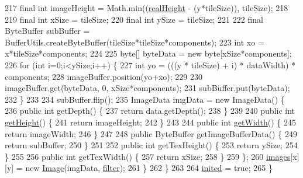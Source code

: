 \begin{DoxyCode}
217                 \textcolor{keyword}{final} \textcolor{keywordtype}{int} imageHeight = Math.min((\mbox{\hyperlink{classorg_1_1newdawn_1_1slick_1_1_big_image_a4a9f1e4248d72ff16ea9e0abe7902685}{realHeight}} - (y*tileSize)), tileSize);
218                 
219                 \textcolor{keyword}{final} \textcolor{keywordtype}{int} xSize = tileSize;
220                 \textcolor{keyword}{final} \textcolor{keywordtype}{int} ySize = tileSize;
221                 
222                 \textcolor{keyword}{final} ByteBuffer subBuffer = BufferUtils.createByteBuffer(tileSize*tileSize*components);
223                 \textcolor{keywordtype}{int} xo = x*tileSize*components;
224 
225                 byte[] byteData = \textcolor{keyword}{new} byte[xSize*components];
226                 \textcolor{keywordflow}{for} (\textcolor{keywordtype}{int} i=0;i<ySize;i++) \{
227                     \textcolor{keywordtype}{int} yo = (((y * tileSize) + i) * dataWidth) * components;
228                     imageBuffer.position(yo+xo);
229                     
230                     imageBuffer.get(byteData, 0, xSize*components);
231                     subBuffer.put(byteData);
232                 \}
233                 
234                 subBuffer.flip();
235                 ImageData imgData = \textcolor{keyword}{new} ImageData() \{
236                     \textcolor{keyword}{public} \textcolor{keywordtype}{int} getDepth() \{
237                         \textcolor{keywordflow}{return} data.getDepth();
238                     \}
239 
240                     \textcolor{keyword}{public} \textcolor{keywordtype}{int} \mbox{\hyperlink{classorg_1_1newdawn_1_1slick_1_1_image_aa2594a93f5126f60ad8a72444fceee98}{getHeight}}() \{
241                         \textcolor{keywordflow}{return} imageHeight;
242                     \}
243 
244                     \textcolor{keyword}{public} \textcolor{keywordtype}{int} \mbox{\hyperlink{classorg_1_1newdawn_1_1slick_1_1_image_a94a5d32276e8a27930480223c5d69e11}{getWidth}}() \{
245                         \textcolor{keywordflow}{return} imageWidth;
246                     \}
247                     
248                     \textcolor{keyword}{public} ByteBuffer getImageBufferData() \{
249                         \textcolor{keywordflow}{return} subBuffer;
250                     \}
251 
252                     \textcolor{keyword}{public} \textcolor{keywordtype}{int} getTexHeight() \{
253                         \textcolor{keywordflow}{return} ySize;
254                     \}
255 
256                     \textcolor{keyword}{public} \textcolor{keywordtype}{int} getTexWidth() \{
257                         \textcolor{keywordflow}{return} xSize;
258                     \}
259                 \};
260                 \mbox{\hyperlink{classorg_1_1newdawn_1_1slick_1_1_big_image_a297fc524b2aef82e75e23a59c6f4102f}{images}}[x][y] = \textcolor{keyword}{new} \mbox{\hyperlink{classorg_1_1newdawn_1_1slick_1_1_image_a2c047fa669a8387f6c2d9bde33b3ee04}{Image}}(imgData, \mbox{\hyperlink{classorg_1_1newdawn_1_1slick_1_1_image_a1c6f09687817420f3762f32bb1c3ed76}{filter}});
261             \}
262         \}
263         
264         \mbox{\hyperlink{classorg_1_1newdawn_1_1slick_1_1_image_aa694324d7d8b46bbe65e066ca29cecfb}{inited}} = \textcolor{keyword}{true};
265     \}
\end{DoxyCode}

